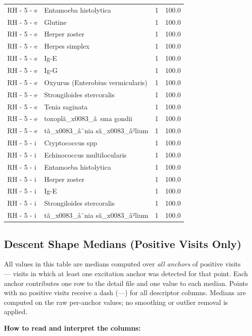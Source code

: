 \documentclass[a4paper,11pt]{article}
\begin{document}
\begin{footnotesize}
\begin{longtable}{p{3.5cm}p{7.5cm}rr}
RH - 5 - e & Entamoeba histolytica & 1 & 100.0 \\
RH - 5 - e & Glutine & 1 & 100.0 \\
RH - 5 - e & Herper zoster & 1 & 100.0 \\
RH - 5 - e & Herpes simplex & 1 & 100.0 \\
RH - 5 - e & Ig-E & 1 & 100.0 \\
RH - 5 - e & Ig-G & 1 & 100.0 \\
RH - 5 - e & Oxyurus (Enterobius vermicularis) & 1 & 100.0 \\
RH - 5 - e & Strongiloides stercoralis & 1 & 100.0 \\
RH - 5 - e & Tenia saginata & 1 & 100.0 \\
RH - 5 - e & toxoplã\_x0083\_â sma gondii & 1 & 100.0 \\
RH - 5 - e & tã\_x0083\_â¨nia sã\_x0083\_â²lium & 1 & 100.0 \\
RH - 5 - i & Cryptococcus spp & 1 & 100.0 \\
RH - 5 - i & Echinococcus multilocularis & 1 & 100.0 \\
RH - 5 - i & Entamoeba histolytica & 1 & 100.0 \\
RH - 5 - i & Herper zoster & 1 & 100.0 \\
RH - 5 - i & Ig-E & 1 & 100.0 \\
RH - 5 - i & Strongiloides stercoralis & 1 & 100.0 \\
RH - 5 - i & tã\_x0083\_â¨nia sã\_x0083\_â²lium & 1 & 100.0 \\
\end{longtable}
\end{footnotesize}

\subsection{Descent Shape Medians (Positive Visits Only)}

All values in this table are medians computed over \emph{all anchors} of positive visits ---
visits in which at least one excitation anchor was detected for that point. Each anchor
contributes one row to the detail file and one value to each median. Points with no positive
visits receive a dash (---) for all descriptor columns.
Medians are computed on the raw per-anchor values; no smoothing or outlier removal is
applied.

\medskip
\noindent\textbf{How to read and interpret the columns:}
\end{document}
